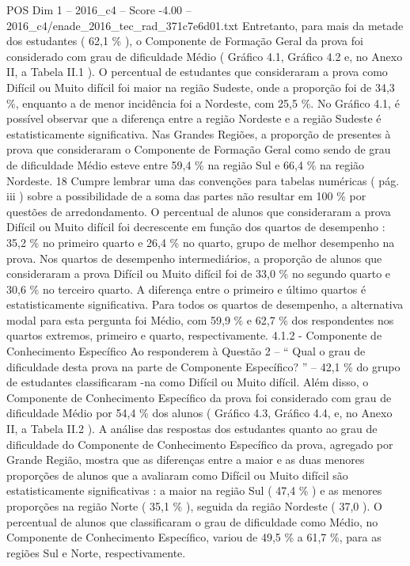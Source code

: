 \begin{textsample}{POS Dim 1 – 2016\_c4 – Score -4.00 – 2016\_c4/enade\_2016\_tec\_rad\_371c7e6d01.txt}
Entretanto, para mais da metade dos estudantes ( 62,1 \% ), o Componente de Formação Geral da prova foi considerado com grau de dificuldade Médio ( Gráfico 4.1, Gráfico 4.2 e, no Anexo II, a Tabela II.1 ).
O percentual de estudantes que consideraram a prova como Difícil ou Muito difícil foi maior na região Sudeste, onde a proporção foi de 34,3 \%, enquanto a de menor incidência foi a Nordeste, com 25,5 \%.
No Gráfico 4.1, é possível observar que a diferença entre a região Nordeste e a região Sudeste é estatisticamente significativa.
Nas Grandes Regiões, a proporção de presentes à prova que consideraram o Componente de Formação Geral como sendo de grau de dificuldade Médio esteve entre 59,4 \% na região Sul e 66,4 \% na região Nordeste. 18 Cumpre lembrar uma das convenções para tabelas numéricas ( pág. iii ) sobre a possibilidade de a soma das partes não resultar em 100 \% por questões de arredondamento.
O percentual de alunos que consideraram a prova Difícil ou Muito difícil foi decrescente em função dos quartos de desempenho : 35,2 \% no primeiro quarto e 26,4 \% no quarto, grupo de melhor desempenho na prova.
Nos quartos de desempenho intermediários, a proporção de alunos que consideraram a prova Difícil ou Muito difícil foi de 33,0 \% no segundo quarto e 30,6 \% no terceiro quarto.
A diferença entre o primeiro e último quartos é estatisticamente significativa.
Para todos os quartos de desempenho, a alternativa modal para esta pergunta foi Médio, com 59,9 \% e 62,7 \% dos respondentes nos quartos extremos, primeiro e quarto, respectivamente. 4.1.2 - Componente de Conhecimento Específico Ao responderem à Questão 2 – “ Qual o grau de dificuldade desta prova na parte de Componente Específico? ” – 42,1 \% do grupo de estudantes classificaram -na como Difícil ou Muito difícil.
Além disso, o Componente de Conhecimento Específico da prova foi considerado com grau de dificuldade Médio por 54,4 \% dos alunos ( Gráfico 4.3, Gráfico 4.4, e, no Anexo II, a Tabela II.2 ).
A análise das respostas dos estudantes quanto ao grau de dificuldade do Componente de Conhecimento Específico da prova, agregado por Grande Região, mostra que as diferenças entre a maior e as duas menores proporções de alunos que a avaliaram como Difícil ou Muito difícil são estatisticamente significativas : a maior na região Sul ( 47,4 \% ) e as menores proporções na região Norte ( 35,1 \% ), seguida da região Nordeste ( 37,0 ).
O percentual de alunos que classificaram o grau de dificuldade como Médio, no Componente de Conhecimento Específico, variou de 49,5 \% a 61,7 \%, para as regiões Sul e Norte, respectivamente.

\end{textsample}
